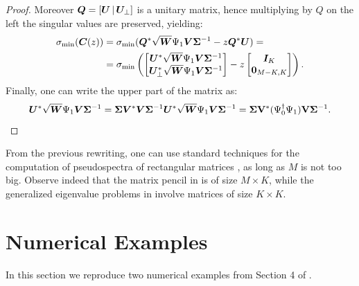 \begin{proof}
Moreover $\vb*{Q} = [\vb*{U}\,\lvert\,\vb*{U}_\perp]$ is a unitary matrix, hence multiplying by $Q$ on the left the singular values are preserved, yielding:
\begin{equation*}
    \begin{split}
        \sigma_{\min}(\vb*{C}(z)) &= \sigma_{\min}(\vb*{Q}^*\sqrt{\vb*{W}}\Psi_1\vb*{V}\bm{\Sigma}^{-1} - z\vb*{Q}^*\vb*{U}) = \\
        & = \sigma_{\min}\left( 
        \begin{bmatrix}
        \vb*{U}^*\sqrt{\vb*{W}}\Psi_1 \vb*{V}\bm{\Sigma}^{-1}\\
        \vb*{U}_{\perp}^*\sqrt{\vb*{W}}\Psi_1 \vb*{V}\bm{\Sigma}^{-1}
        \end{bmatrix} - z 
        \begin{bmatrix}
        \vb*{I}_K\\
        \vb*{0}_{M-K, K}\\
        \end{bmatrix}
        \right).
    \end{split}
\end{equation*}
Finally, one can write the upper part of the matrix as:
\begin{equation*}
    \vb*{U}^*\sqrt{\vb*{W}}\Psi_1 \vb*{V}\bm{\Sigma}^{-1} = \bm{\Sigma} \vb*{V}^* \vb*{V}\bm{\Sigma}^{-1}\vb*{U}^*\sqrt{\vb*{W}}\Psi_1 \vb*{V}\bm{\Sigma}^{-1} = \bm{\Sigma}\vb{V}^*(\Psi_0^\dagger \Psi_1)\vb{V}\bm{\Sigma}^{-1}.
\end{equation*}
\end{proof}

From the previous rewriting, one can use standard techniques for the computation of pseudospectra of rectangular matrices \cite{wright_pseudospectra_2002}, as long as $M$ is not too big. Observe indeed that the matrix pencil in  is of size $M\times K$, while the generalized eigenvalue problems in  involve matrices of size $K\times K$.

\newpage

\section{Numerical Examples}
\label{section_experiments}
In this section we reproduce two numerical examples from Section 4 of \cite{colbrook_rigorous_2021}.

